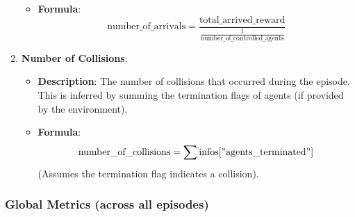 \begin{enumerate}
\begin{itemize}
        \item \textbf{Formula}:
        \[
        \text{number\_of\_arrivals} = \frac{\text{total\_arrived\_reward}}{\frac{1}{\text{number\_of\_controlled\_agents}}}
        \]
    \end{itemize}
    
    \item \textbf{Number of Collisions}:
    \begin{itemize}
        \item \textbf{Description}: The number of collisions that occurred during the episode. This is inferred by summing the termination flags of agents (if provided by the environment).
        \item \textbf{Formula}:
        \[
        \text{number\_of\_collisions} = \sum \text{infos}["\text{agents\_terminated}"]
        \]
        (Assumes the termination flag indicates a collision).
    \end{itemize}
\end{enumerate}

\subsubsection*{Global Metrics (across all episodes)}

